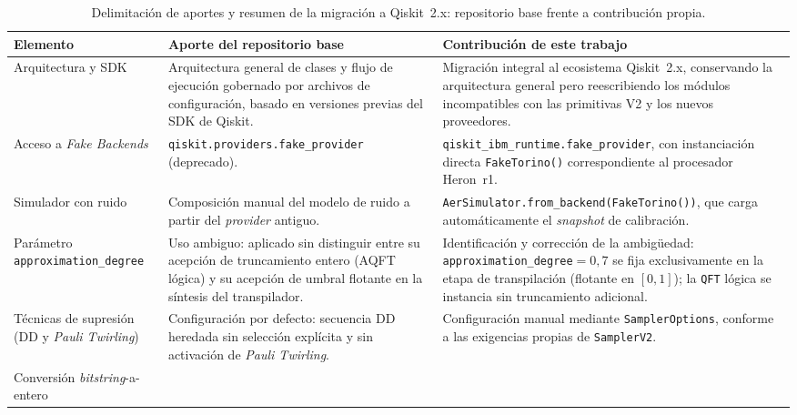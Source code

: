 \documentclass[12pt, spanish]{book}
\begin{document}
\begin{table}[H]
    \centering
    \caption{Delimitación de aportes y resumen de la migración a Qiskit~2.x: repositorio base frente a contribución propia.\\}
    \label{tab:delimitacion-aportes}
    \footnotesize
    \begin{tabular}{p{} p{} p{}}
        \toprule
        \textbf{Elemento} & \textbf{Aporte del repositorio base \cite{villarreal}} & \textbf{Contribución de este trabajo} \\
        \midrule
        Arquitectura y SDK
            & Arquitectura general de clases y flujo de ejecución gobernado por archivos de configuración, basado en versiones previas del SDK de Qiskit.
            & Migración integral al ecosistema Qiskit~2.x, conservando la arquitectura general pero reescribiendo los módulos incompatibles con las primitivas V2 y los nuevos proveedores. \\
        \midrule
        Acceso a \textit{Fake Backends}
            & \texttt{qiskit.providers.fake\_pro\-vider} (deprecado).
            & \texttt{qiskit\_ibm\_runtime.fake\_pro\-vider}, con instanciación directa \texttt{FakeTorino()} correspondiente al procesador Heron~r1. \\
        \midrule
        Simulador con ruido
            & Composición manual del modelo de ruido a partir del \textit{provider} antiguo.
            & \texttt{AerSimulator.from\_backend\-(FakeTorino())}, que carga automáticamente el \textit{snapshot} de calibración. \\
        \midrule
        Parámetro \texttt{approximation\_de\-gree}
            & Uso ambiguo: aplicado sin distinguir entre su acepción de truncamiento entero (AQFT lógica) y su acepción de umbral flotante en la síntesis del transpilador.
            & Identificación y corrección de la ambigüedad: \texttt{approximation\_degree}$=0{,}7$ se fija exclusivamente en la etapa de transpilación (flotante en $[0,1]$); la \texttt{QFT} lógica se instancia sin truncamiento adicional. \\
        \midrule
        Técnicas de supresión (DD y \textit{Pauli Twirling})
            & Configuración por defecto: secuencia DD heredada sin selección explícita y sin activación de \textit{Pauli Twirling}.
            & Configuración manual mediante \texttt{SamplerOptions}, conforme a las exigencias propias de \texttt{SamplerV2}. \\
        \midrule
        Conversión \textit{bitstring}-a-entero

\end{tabular}
\end{table}
\end{document}
